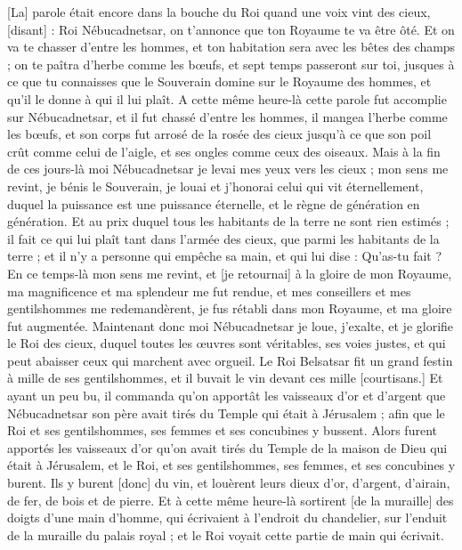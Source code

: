 \begin{multicols}{2}
[La] parole était encore dans la bouche du Roi quand une voix vint des cieux, [disant] : Roi Nébucadnetsar, on t'annonce que ton Royaume te va être ôté.
Et on va te chasser d'entre les hommes, et ton habitation sera avec les bêtes des champs ; on te paîtra d'herbe comme les bœufs, et sept temps passeront sur toi, jusques à ce que tu connaisses que le Souverain domine sur le Royaume des hommes, et qu'il le donne à qui il lui plaît.
A cette même heure-là cette parole fut accomplie sur Nébucadnetsar, et il fut chassé d'entre les hommes, il mangea l'herbe comme les bœufs, et son corps fut arrosé de la rosée des cieux jusqu'à ce que son poil crût comme celui de l'aigle, et ses ongles comme ceux des oiseaux.
Mais à la fin de ces jours-là moi Nébucadnetsar je levai mes yeux vers les cieux ; mon sens me revint, je bénis le Souverain, je louai et j'honorai celui qui vit éternellement, duquel la puissance est une puissance éternelle, et le règne de génération en génération.
Et au prix duquel tous les habitants de la terre ne sont rien estimés ; il fait ce qui lui plaît tant dans l'armée des cieux, que parmi les habitants de la terre ; et il n'y a personne qui empêche sa main, et qui lui dise : Qu'as-tu fait ?
En ce temps-là mon sens me revint, et [je retournai] à la gloire de mon Royaume, ma magnificence et ma splendeur me fut rendue, et mes conseillers et mes gentilshommes me redemandèrent, je fus rétabli dans mon Royaume, et ma gloire fut augmentée.
Maintenant donc moi Nébucadnetsar je loue, j'exalte, et je glorifie le Roi des cieux, duquel toutes les œuvres sont véritables, ses voies justes, et qui peut abaisser ceux qui marchent avec orgueil.
\VerseOne{}Le Roi Belsatsar fit un grand festin à mille de ses gentilshommes, et il buvait le vin devant ces mille [courtisans.]
Et ayant un peu bu, il commanda qu'on apportât les vaisseaux d'or et d'argent que Nébucadnetsar son père avait tirés du Temple qui était à Jérusalem ; afin que le Roi et ses gentilshommes, ses femmes et ses concubines y bussent.
Alors furent apportés les vaisseaux d'or qu'on avait tirés du Temple de la maison de Dieu qui était à Jérusalem, et le Roi, et ses gentilshommes, ses femmes, et ses concubines y burent.
Ils y burent [donc] du vin, et louèrent leurs dieux d'or, d'argent, d'airain, de fer, de bois et de pierre.
Et à cette même heure-là sortirent [de la muraille] des doigts d'une main d'homme, qui écrivaient à l'endroit du chandelier, sur l'enduit de la muraille du palais royal ; et le Roi voyait cette partie de main qui écrivait.

\end{multicols}
